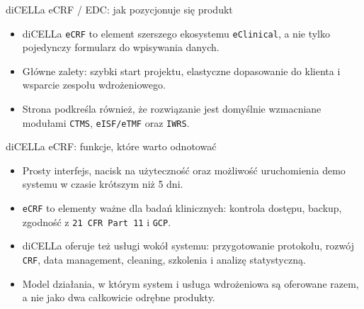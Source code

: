 \begin{frame}{diCELLa eCRF / EDC: jak pozycjonuje się produkt}
  \begin{itemize}
    \item diCELLa \texttt{eCRF} to element szerszego ekosystemu \texttt{eClinical}, a nie tylko pojedynczy formularz do wpisywania danych.
    \item Główne zalety: szybki start projektu, elastyczne dopasowanie do klienta i wsparcie zespołu wdrożeniowego.
    \item Strona podkreśla również, że rozwiązanie jest domyślnie wzmacniane modułami \texttt{CTMS}, \texttt{eISF/eTMF} oraz \texttt{IWRS}.
  \end{itemize}
\end{frame}

\begin{frame}{diCELLa eCRF: funkcje, które warto odnotować}
  \begin{itemize}
    \item Prosty interfejs, nacisk na użyteczność oraz możliwość uruchomienia demo systemu w czasie krótszym niż 5 dni.
    \item \texttt{eCRF} to elementy ważne dla badań klinicznych: kontrola dostępu, backup, zgodność z \texttt{21 CFR Part 11} i \texttt{GCP}.
    \item diCELLa oferuje też usługi wokół systemu: przygotowanie protokołu, rozwój \texttt{CRF}, data management, cleaning, szkolenia i analizę statystyczną.
    \item Model działania, w którym system i usługa wdrożeniowa są oferowane razem, a nie jako dwa całkowicie odrębne produkty.
  \end{itemize}
\end{frame}


